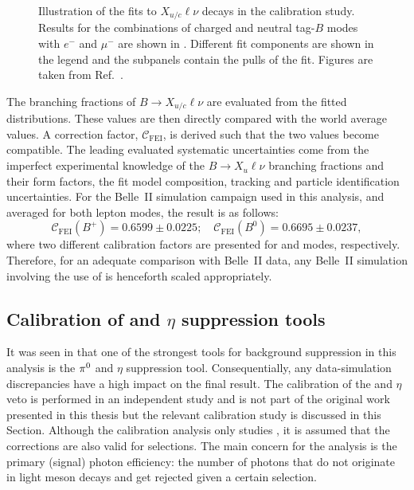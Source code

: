 \begin{figure}[htbp!]
{    }
    \caption{\label{fig:fei_calib} Illustration of the fits to \B\to$X_{u/c}\ell\nu$ decays in the \FEI calibration study.
    Results for the combinations of charged and neutral tag-$B$ modes with $e^-$ and $\mu^-$
    are shown in .
    Different fit components are shown in the legend and the subpanels contain the pulls of the fit.
    Figures are taken from Ref.~\cite{Belle-II:2020fst}.
    }
\end{figure}

The branching fractions of $B\rightarrow X_{u/c}\ell\nu$ are evaluated from the fitted distributions.
These values are then directly compared with the world average values.
A correction factor, $\mathcal{C}_{\mathrm{FEI}}$, is derived such that the two values become compatible.
The leading evaluated systematic uncertainties come from the imperfect experimental knowledge of the $B\rightarrow X_u\ell\nu$ branching fractions and their form factors, the fit model composition, tracking and particle identification uncertainties.
For the Belle~II simulation campaign used in this analysis, and averaged for both lepton modes, the result is as follows:
\begin{equation}\label{eq:fei_calibration}
    \mathcal{C}_{\mathrm{FEI}}(B^+) = 0.6599 \pm 0.0225; \quad \mathcal{C}_{\mathrm{FEI}}(B^0) = 0.6695 \pm 0.0237,
\end{equation}
where two different calibration factors are presented for \feiBp and \feiBz modes, respectively.
Therefore, for an adequate comparison with Belle~II data, any Belle~II simulation involving the use of \FEI is henceforth scaled appropriately.

\subsection{Calibration of \texorpdfstring{\piz}{pi0} and \texorpdfstring{$\eta$}{eta} suppression tools}\label{sec:piz_eta_calibration}
It was seen in  that one of the strongest tools for background suppression in this analysis is the $\pi^0$ and $\eta$ suppression tool.
Consequentially, any data-simulation discrepancies have a high impact on the final result.
The calibration of the \piz and $\eta$ veto is performed in an independent study and is not part of the original work presented in this thesis 
but the relevant calibration study is discussed in this Section.
Although the calibration analysis only studies \piVeto, it is assumed that the corrections are also valid for \etaVeto selections.
The main concern for the \BtoXsgamma analysis is the primary (signal) photon efficiency: the number of photons that do not originate in light meson decays and get rejected given a certain \piVeto selection.

